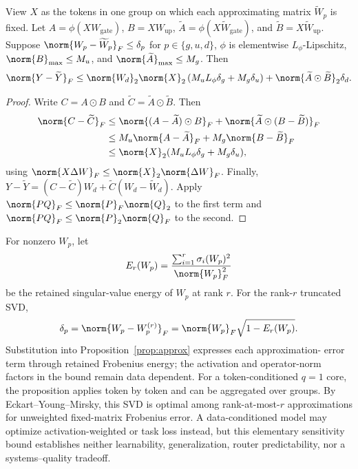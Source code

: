 \begin{proposition}
\label{prop:approx}
View $X$ as the tokens in one group on which each approximating matrix
$\widetilde W_p$ is fixed.  Let $A=\phi(XW_{\mathrm{gate}})$,
$B=XW_{\mathrm{up}}$, $\widetilde A=\phi(X\widetilde W_{\mathrm{gate}})$, and
$\widetilde B=X\widetilde W_{\mathrm{up}}$.  Suppose
$\norm{W_p-\widetilde W_p}_F\le\delta_p$ for
$p\in\{g,u,d\}$, $\phi$ is elementwise $L_\phi$-Lipschitz,
$\norm{B}_{\max}\le M_u$, and
$\norm{\widetilde A}_{\max}\le M_g$. Then
\begin{equation}
\norm{Y-\widetilde{Y}}_F
\le \norm{W_d}_2\norm{X}_2
  \left(M_uL_\phi\delta_g+M_g\delta_u\right)
  + \norm{\widetilde A\odot\widetilde B}_2\delta_d.
\end{equation}
\end{proposition}
\begin{proof}
Write $C=A\odot B$ and
$\widetilde C=\widetilde A\odot\widetilde B$.  Then
\begin{align}
\norm{C-\widetilde C}_F
&\le \norm{(A-\widetilde A)\odot B}_F
   +\norm{\widetilde A\odot(B-\widetilde B)}_F \\
&\le M_u\norm{A-\widetilde A}_F
   +M_g\norm{B-\widetilde B}_F \\
&\le \norm{X}_2(M_uL_\phi\delta_g+M_g\delta_u),
\end{align}
using $\norm{X\Delta W}_F\le\norm{X}_2\norm{\Delta W}_F$.
Finally,
$Y-\widetilde Y=(C-\widetilde C)W_d
+\widetilde C(W_d-\widetilde W_d)$.  Apply
$\norm{PQ}_F\le\norm{P}_F\norm{Q}_2$ to the first term and
$\norm{PQ}_F\le\norm{P}_2\norm{Q}_F$ to the second.
\end{proof}

\begin{corollary}
\label{cor:rankapprox}
For nonzero $W_p$, let
\begin{equation}
E_r(W_p)=\frac{\sum_{i=1}^{r}\sigma_i(W_p)^2}{\norm{W_p}_F^2}
\end{equation}
be the retained singular-value energy of $W_p$ at rank $r$.  For the rank-$r$
truncated SVD,
\begin{equation}
\delta_p=\norm{W_p-W_p^{(r)}}_F
=\norm{W_p}_F\sqrt{1-E_r(W_p)}.
\end{equation}
Substitution into Proposition~\ref{prop:approx} expresses each approximation-
error term through retained Frobenius energy; the activation and operator-norm
factors in the bound remain data dependent.  For a token-conditioned $q=1$
core, the proposition applies token by token and can be aggregated over groups.
By Eckart--Young--Mirsky, this SVD is
optimal among rank-at-most-$r$ approximations for unweighted fixed-matrix
Frobenius error.  A data-conditioned model may optimize activation-weighted or
task loss instead, but this elementary sensitivity bound establishes neither
learnability, generalization, router predictability, nor a systems--quality
tradeoff.
\end{corollary}



